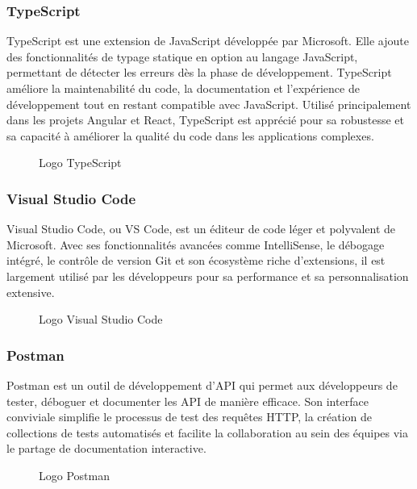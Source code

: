 \subsubsection*{TypeScript}
TypeScript est une extension de JavaScript\cite{b7} développée par Microsoft. Elle ajoute des fonctionnalités de typage statique en option au langage JavaScript, permettant de détecter les erreurs dès la phase de développement. TypeScript améliore la maintenabilité du code, la documentation et l'expérience de développement tout en restant compatible avec JavaScript. Utilisé principalement dans les projets Angular et React, TypeScript est apprécié pour sa robustesse et sa capacité à améliorer la qualité du code dans les applications complexes.\cite{b18}
\begin{figure}[H]
\centering
{}
\caption{Logo TypeScript}
\end{figure}

\subsubsection*{Visual Studio Code}
Visual Studio Code, ou VS Code, est un éditeur de code léger et polyvalent de Microsoft. Avec ses fonctionnalités avancées comme IntelliSense, le débogage intégré, le contrôle de version Git et son écosystème riche d'extensions, il est largement utilisé par les développeurs pour sa performance et sa personnalisation extensive.\cite{b19}
\begin{figure}[H]
\centering
{}
\caption{Logo Visual Studio Code}
\end{figure}

\subsubsection*{Postman}
Postman est un outil de développement d'API qui permet aux développeurs de tester, déboguer et documenter les API de manière efficace. Son interface conviviale simplifie le processus de test des requêtes HTTP, la création de collections de tests automatisés et facilite la collaboration au sein des équipes via le partage de documentation interactive.\cite{b20}
\begin{figure}[H]
\centering
{}
\caption{Logo Postman}
\end{figure}

